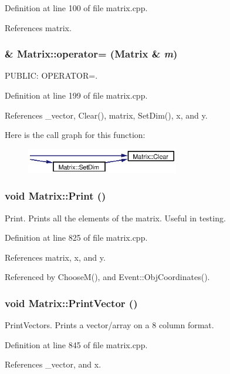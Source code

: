 Definition at line 100 of file matrix.cpp.

References matrix.
\subsubsection{ \& Matrix::operator= ({\bf Matrix} \& {\em m})}\label{classMatrix_a3}


PUBLIC: OPERATOR=. 

Definition at line 199 of file matrix.cpp.

References \_\-vector, Clear(), matrix, Set\-Dim(), x, and y.

Here is the call graph for this function:\begin{figure}[H]
\begin{center}
\leavevmode
\includegraphics[width=189pt]{classMatrix_a3_cgraph}
\end{center}
\end{figure}
\subsubsection{\setlength{\rightskip}{0pt plus 5cm}void Matrix::Print ()}\label{classMatrix_a27}


Print. Prints all the elements of the matrix. Useful in testing. 

Definition at line 825 of file matrix.cpp.

References matrix, x, and y.

Referenced by Choose\-M(), and Event::Obj\-Coordinates().
\subsubsection{\setlength{\rightskip}{0pt plus 5cm}void Matrix::Print\-Vector ()}\label{classMatrix_a28}


Print\-Vectors. Prints a vector/array on a 8 column format. 

Definition at line 845 of file matrix.cpp.

References \_\-vector, and x.

